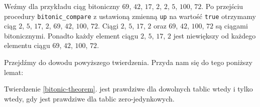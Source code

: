 Weźmy dla przykładu ciąg bitoniczny $69$, $42$, $17$, $2$, $2$, $5$, $100$, $72$.
Po przejściu procedury \texttt{bitonic\_compare} z ustawioną zmienną \texttt{up} na wartość \texttt{true} otrzymamy ciąg $2$, $5$, $17$, $2$, $69$, $42$, $100$, $72$.
Ciągi $2$, $5$, $17$, $2$ oraz $69$, $42$, $100$, $72$ są ciągami bitonicznymi.
Ponadto każdy element ciągu $2$, $5$, $17$, $2$ jest niewiększy od każdego elementu ciągu $69$, $42$, $100$, $72$.

Przejdźmy do dowodu powyższego twierdzenia.
Przyda nam się do tego poniższy lemat:

\begin{lemma}
 Twierdzenie \ref{bitonic-theorem}. jest prawdziwe dla dowolnych tablic wtedy i tylko wtedy, gdy jest prawdziwe dla tablic zero-jedynkowych.
 \label{zero-one-lemma}
\end{lemma}

